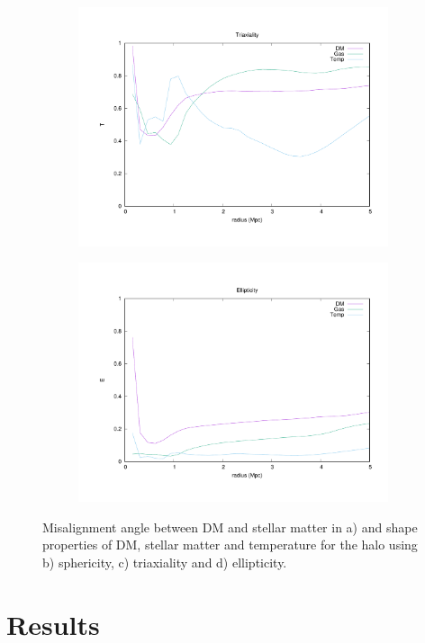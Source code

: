 \documentclass[journal]{IEEEtran}
\begin{document}
\begin{figure}[!t]
\begin{subfigure}[t]{0.45\textwidth}
		\includegraphics[width=\linewidth]{Triaxiality}
	\end{subfigure}
	\quad
	\begin{subfigure}[t]{0.45\textwidth}
		\centering
		\includegraphics[width=\linewidth]{Ellipticity}
	\end{subfigure}
\caption{Misalignment angle between DM and stellar matter in a) and shape properties of DM, stellar matter and temperature for the halo using b) sphericity, c) triaxiality and d) ellipticity.}
\label{fig:shapes}
\end{figure}


\section{Results}
\end{document}
